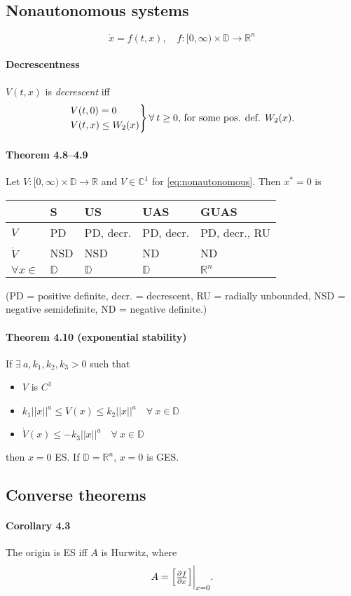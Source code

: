 \subsection{Nonautonomous systems}
\begin{equation}\label{eq:nonautonomous}
	\dot{x} = f(t,x), \quad f : [0,\infty) \times \mathbb{D} \to \mathbb{R}^n
\end{equation}

\paragraph{Decrescentness}
$V(t,x)$ is \emph{decrescent} iff
\begin{equation}
	\begin{rcases}
		V(t,0) =    0      \\
		V(t,x) \leq W_2(x)
	\end{rcases}
	\forall \: t \geq 0
	\mbox{, for some pos. def. }
	W_2(x).
\end{equation}

\paragraph{Theorem 4.8--4.9}
Let $V : [0,\infty) \times \mathbb{D} \to \mathbb{R}$ and $V \in \mathbb{C}^1$ for \eqref{eq:nonautonomous}. Then $x^* = 0$ is
\begin{center}
	\begin{tabular}{lllll}
		& S & US & UAS & GUAS \\
		\hline
		$V$ & PD & PD, decr. & PD, decr. & PD, decr., RU \\
		$\dot{V}$ & NSD & NSD & ND & ND \\
		$\forall x \in$ & $\mathbb{D}$ & $\mathbb{D}$ & $\mathbb{D}$ & $\mathbb{R}^n$
	\end{tabular}
\end{center}
(PD = positive definite, decr. = decrescent, RU = radially unbounded, NSD = negative semidefinite, ND = negative definite.)

\paragraph{Theorem 4.10 (exponential stability)}
If $\exists \: a, k_1, k_2, k_3 > 0$ such that
\begin{itemize}
	\item $V$ is $C^1$
	\item $k_1 ||x||^a \leq V(x) \leq k_2 ||x||^a \quad \forall \: x \in \mathbb{D}$
	\item $\dot{V}(x) \leq - k_3 ||x||^a \quad \forall \: x \in \mathbb{D}$
\end{itemize}
then $x = 0$ ES. If $\mathbb{D} = \mathbb{R}^n$, $x = 0$ is GES.

\subsection{Converse theorems}
\paragraph{Corollary 4.3}
The origin is ES iff $A$ is Hurwitz, where
\begin{equation}
	A =
	\begin{bmatrix}
		\pd{f}{x}
	\end{bmatrix}
	\evalat{x=0}
	.
\end{equation}

